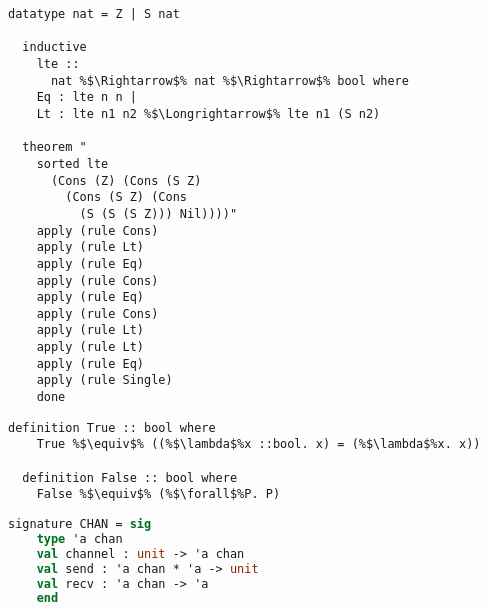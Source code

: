 \documentclass{article}
\begin{document}
\begin{lstlisting}[style=codestyle1, escapechar=\%]
  datatype nat = Z | S nat 

  inductive
    lte ::
      nat %$\Rightarrow$% nat %$\Rightarrow$% bool where
    Eq : lte n n |
    Lt : lte n1 n2 %$\Longrightarrow$% lte n1 (S n2)

  theorem "
    sorted lte
      (Cons (Z) (Cons (S Z)
        (Cons (S Z) (Cons
          (S (S (S Z))) Nil))))"
    apply (rule Cons)
    apply (rule Lt)
    apply (rule Eq)
    apply (rule Cons)
    apply (rule Eq)
    apply (rule Cons)
    apply (rule Lt)
    apply (rule Lt)
    apply (rule Eq)
    apply (rule Single)
    done
  \end{lstlisting}

\begin{lstlisting}[style=codestyle1, escapechar=\%]
  definition True :: bool where 
    True %$\equiv$% ((%$\lambda$%x ::bool. x) = (%$\lambda$%x. x))

  definition False :: bool where 
    False %$\equiv$% (%$\forall$%P. P)

  \end{lstlisting}

\begin{lstlisting}[language=ML, style=codestyle1]
  signature CHAN = sig
    type 'a chan 
    val channel : unit -> 'a chan
    val send : 'a chan * 'a -> unit
    val recv : 'a chan -> 'a
    end     
\end{lstlisting}
\end{document}
